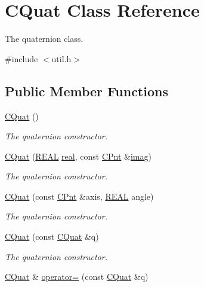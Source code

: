 \hypertarget{classCQuat}{\section{C\-Quat Class Reference}
\label{classCQuat}
}


The quaternion class.  




{\ttfamily \#include $<$util.\-h$>$}

\subsection*{Public Member Functions}
\begin{DoxyCompactItemize}
\item 
\hyperlink{classCQuat_aa8497e624cd8c83814ee708beed80be8}{C\-Quat} ()
\begin{DoxyCompactList}\small\item\em The quaternion constructor. \end{DoxyCompactList}\item 
\hyperlink{classCQuat_a9e2eb21a9c7ec78d94e0fe38e34b242b}{C\-Quat} (\hyperlink{util_8h_a5821460e95a0800cf9f24c38915cbbde}{R\-E\-A\-L} \hyperlink{classCQuat_a7f18efa604d788a39bb6726de6546ce2}{real}, const \hyperlink{classCPnt}{C\-Pnt} \&\hyperlink{classCQuat_a783b34fbc307fbb00fd112c8441b0f30}{imag})
\begin{DoxyCompactList}\small\item\em The quaternion constructor. \end{DoxyCompactList}\item 
\hyperlink{classCQuat_a5225432b6d2298207cadd596073a500c}{C\-Quat} (const \hyperlink{classCPnt}{C\-Pnt} \&axis, \hyperlink{util_8h_a5821460e95a0800cf9f24c38915cbbde}{R\-E\-A\-L} angle)
\begin{DoxyCompactList}\small\item\em The quaternion constructor. \end{DoxyCompactList}\item 
\hyperlink{classCQuat_acd11b75e7090f6a6992425bcc5416219}{C\-Quat} (const \hyperlink{classCQuat}{C\-Quat} \&q)
\begin{DoxyCompactList}\small\item\em The quaternion constructor. \end{DoxyCompactList}\item 
\hyperlink{classCQuat}{C\-Quat} \& \hyperlink{classCQuat_ad7a24172721a059adcbf40f6db7584fb}{operator=} (const \hyperlink{classCQuat}{C\-Quat} \&q)

\end{DoxyCompactItemize}
